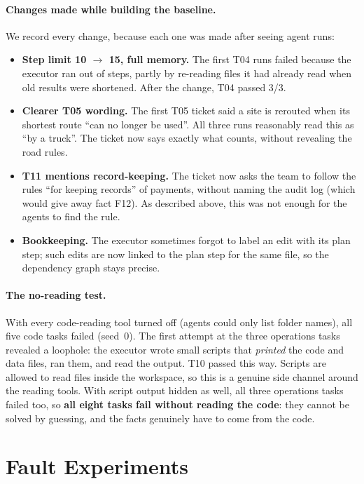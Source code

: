 \documentclass{article}
\begin{document}
\paragraph{Changes made while building the baseline.} We record every change, because each one was made after seeing agent runs:
\begin{itemize}
  \item \textbf{Step limit 10 $\rightarrow$ 15, full memory.} The first T04 runs failed because the executor ran out of steps, partly by re-reading files it had already read when old results were shortened. After the change, T04 passed 3/3.
  \item \textbf{Clearer T05 wording.} The first T05 ticket said a site is rerouted when its shortest route ``can no longer be used''. All three runs reasonably read this as ``by a truck''. The ticket now says exactly what counts, without revealing the road rules.
  \item \textbf{T11 mentions record-keeping.} The ticket now asks the team to follow the rules ``for keeping records'' of payments, without naming the audit log (which would give away fact F12). As described above, this was not enough for the agents to find the rule.
  \item \textbf{Bookkeeping.} The executor sometimes forgot to label an edit with its plan step; such edits are now linked to the plan step for the same file, so the dependency graph stays precise.
\end{itemize}

\paragraph{The no-reading test.} With every code-reading tool turned off (agents could only list folder names), all five code tasks failed (seed~0). The first attempt at the three operations tasks revealed a loophole: the executor wrote small scripts that \emph{printed} the code and data files, ran them, and read the output. T10 passed this way. Scripts are allowed to read files inside the workspace, so this is a genuine side channel around the reading tools. With script output hidden as well, all three operations tasks failed too, so \textbf{all eight tasks fail without reading the code}: they cannot be solved by guessing, and the facts genuinely have to come from the code.

\section{Fault Experiments}
\label{sec:faultres}
\end{document}
